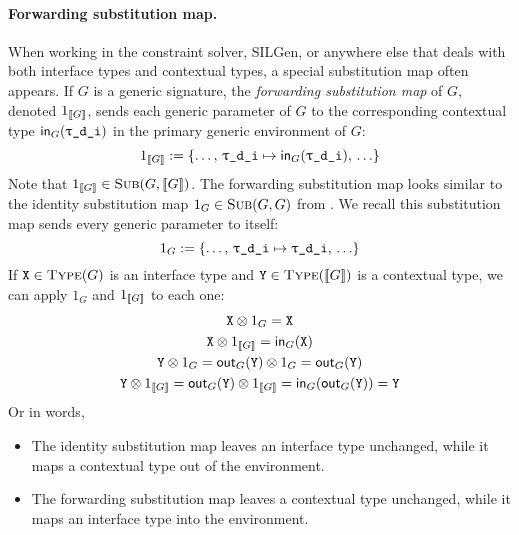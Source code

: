 \documentclass[../generics]{subfiles}
\begin{document}
\paragraph{Forwarding substitution map.} When working in the constraint solver, SILGen, or anywhere else that deals with both interface types and contextual types, a special substitution map often appears. If $G$ is a generic signature, the \emph{forwarding substitution map} of $G$, denoted $1_{[\![G]\!]}$, sends each generic parameter  of $G$ to the corresponding contextual type $\MapIn(\ttgp{d}{i})$ in the primary generic environment of $G$:
\[1_{\EquivClass{G}}:=\{\ldots,\,\ttgp{d}{i}\mapsto\MapIn(\ttgp{d}{i}),\,\ldots\}\]
Note that $1_{[\![G]\!]}\in\textsc{Sub}({G, [\![G]\!]})$. The forwarding substitution map looks similar to the identity substitution map $1_G\in\textsc{Sub}({G, G})$ from . We recall this substitution map sends every generic parameter to itself:
\[1_{G}:=\{\ldots,\,\ttgp{d}{i}\mapsto\ttgp{d}{i},\,\ldots\}\]
If $\texttt{X}\in\textsc{Type}({G})$ is an interface type and $\texttt{Y}\in\textsc{Type}({[\![G]\!]})$ is a contextual type, we can apply $1_G$ and $1_{[\![G]\!]}$ to each one:
\begin{gather*}
\texttt{X}\otimes 1_G=\texttt{X}\\
\texttt{X}\otimes 1_{[\![G]\!]}=\mathsf{in}_G(\texttt{X})\\
\texttt{Y}\otimes 1_G=\mathsf{out}_G(\texttt{Y})\otimes 1_G=\mathsf{out}_G(\texttt{Y})\\
\texttt{Y}\otimes 1_{[\![G]\!]}=\mathsf{out}_G(\texttt{Y})\otimes 1_{[\![G]\!]}=\mathsf{in}_G(\mathsf{out}_G(\texttt{Y}))=\texttt{Y}
\end{gather*}
Or in words,
\begin{itemize}
\item The identity substitution map leaves an interface type unchanged, while it maps a contextual type out of the environment.
\item The forwarding substitution map leaves a contextual type unchanged, while it maps an interface type into the environment.
\end{itemize}
\end{document}
